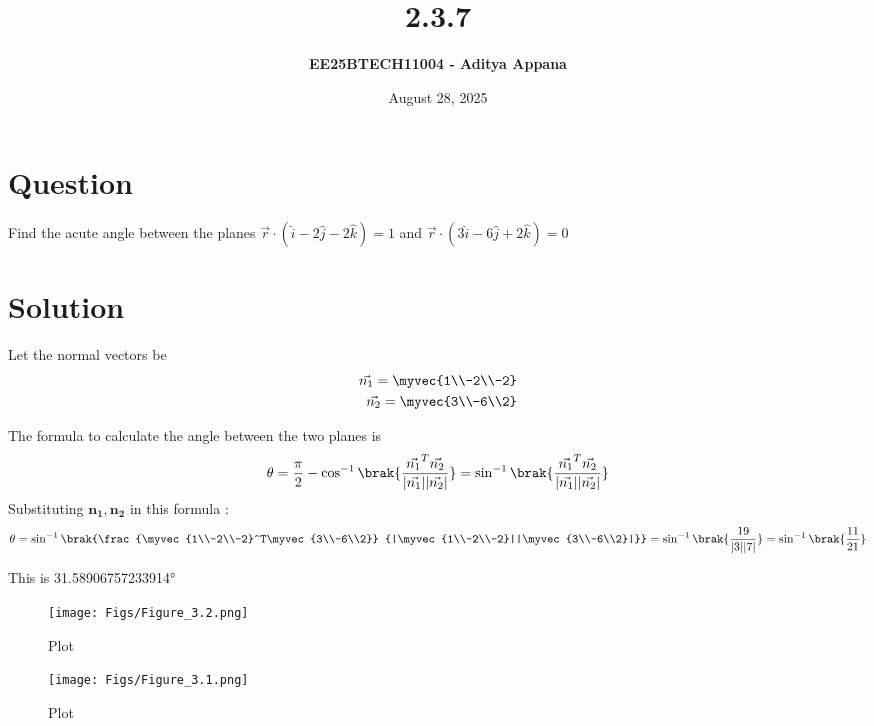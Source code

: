 \documentclass[12pt]{article}
\title{\textbf{2.3.7}}
\author{\textbf{EE25BTECH11004 - Aditya Appana}}
\date{August 28, 2025}
\begin{document}
\maketitle

\section*{Question}
Find the acute angle between the planes $ \vec{r} \cdot (\hat{i} - 2\hat{j} - 2\hat{k}) = 1$ and  $ \vec{r} \cdot (3\hat{i} - 6\hat{j} + 2\hat{k}) = 0$

\section*{Solution}
Let the normal vectors be 
\begin{align} 
\vec{n_1}=\myvec{1\\-2\\-2} \\
\vec{n_2}=\myvec{3\\-6\\2}
\end{align}

\vspace{1cm}

The formula to calculate the angle between the two planes is
\begin{align}
\theta = \frac{\pi}{2} - \cos^{-1}\brak{\frac{\vec{n_1}^T\vec{n_2}}{|\vec{n_1}||\vec{n_2}|}}
= \sin^{-1}\brak{\frac{\vec{n_1}^T\vec{n_2}}{|\vec{n_1}||\vec{n_2}|}}
\end{align}
\newpage
Substituting $\mathbf{n_1, n_2}$ in this formula :
\begin{align}
\theta = \sin^{-1}\brak{\frac{\myvec{1\\-2\\-2}^T\myvec{3\\-6\\2}} {|\myvec{1\\-2\\-2}||\myvec{3\\-6\\2}|}}
= \sin^{-1}\brak{\frac{19}{|3||7|}}
= \sin^{-1}\brak{\frac{11}{21}} 
\end{align}
\vspace{0.5cm}

\centering
This is 31.58906757233914°

\begin{figure}[H]
    \centering
    \texttt{[image: Figs/Figure\_3.2.png]}
    \caption{Plot}
    \label{fig:placeholder}
\end{figure}

\begin{figure}[H]
    \centering
    \texttt{[image: Figs/Figure\_3.1.png]}
    \caption{Plot}
    \label{fig:placeholder}
\end{figure}
\end{document}

